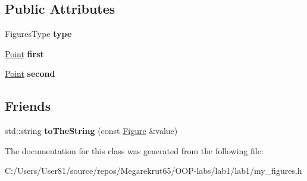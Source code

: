 \subsection*{Public Attributes}
\begin{DoxyCompactItemize}
\item 
\mbox{\label{classfop_1_1_figure_ab3800215a1229d637bae3c24cfc59e08}} 
Figures\+Type {\bfseries type}
\item 
\mbox{\label{classfop_1_1_figure_afac8422d33b66489e3a7ddda4751d219}} 
\mbox{\hyperlink{structtdp_1_1_point}{Point}} {\bfseries first}
\item 
\mbox{\label{classfop_1_1_figure_a10aa53d6dcfa427b06ebcf93ae6075b9}} 
\mbox{\hyperlink{structtdp_1_1_point}{Point}} {\bfseries second}
\end{DoxyCompactItemize}
\subsection*{Friends}
\begin{DoxyCompactItemize}
\item 
\mbox{\label{classfop_1_1_figure_a64f76b9a0cc2e1c8d1f1a8a025e76078}} 
std\+::string {\bfseries to\+The\+String} (const \mbox{\hyperlink{classfop_1_1_figure}{Figure}} \&value)
\end{DoxyCompactItemize}


The documentation for this class was generated from the following file\+:\begin{DoxyCompactItemize}
\item 
C\+:/\+Users/\+User81/source/repos/\+Megarekrut65/\+O\+O\+P-\/labs/lab1/lab1/my\+\_\+figures.\+h\end{DoxyCompactItemize}
